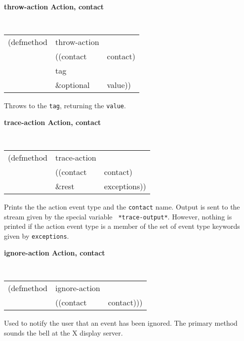 \documentclass[twoside]{book}
\begin{document}
\begin{sloppy}
{\samepage
{\large {\bf throw-action \hfill Action, contact}}
\begin{flushright} 
\parbox[t]{6.125in}{
\tt
\begin{tabular}{lll}
\raggedright
(defmethod & throw-action & \\
& ((contact  &contact)\\
&  tag\\
& \&optional &  value))
\end{tabular}
\rm
}\end{flushright}}
\begin{flushright} 
\parbox[t]{6.125in}{
Throws to the {\tt tag}, returning the {\tt value}.}\end{flushright}

{\samepage
{\large {\bf trace-action \hfill Action, contact}}
\begin{flushright} 
\parbox[t]{6.125in}{
\tt
\begin{tabular}{lll}
\raggedright
(defmethod & trace-action & \\
& ((contact  &contact)\\
& \&rest & exceptions))
\end{tabular}
\rm
}\end{flushright}}
\begin{flushright} 
\parbox[t]{6.125in}{
Prints the the action event type and the {\tt contact} name. Output is sent
to the stream given by the special variable {\tt
*trace-output*}.
However, nothing is printed if the action event type is a member
of the set of  event type
keywords given by {\tt exceptions}.}\end{flushright}

{\samepage
{\large {\bf ignore-action \hfill Action, contact}}
\begin{flushright} 
\parbox[t]{6.125in}{
\tt
\begin{tabular}{lll}
\raggedright
(defmethod & ignore-action & \\
& ((contact  &contact)))
\end{tabular}
\rm

}\end{flushright}}

\begin{flushright} 
\parbox[t]{6.125in}{
Used to notify the user that an event has been ignored. The primary method
sounds the bell at the X display server. 
}\end{flushright}


\end{sloppy}
\end{document}
